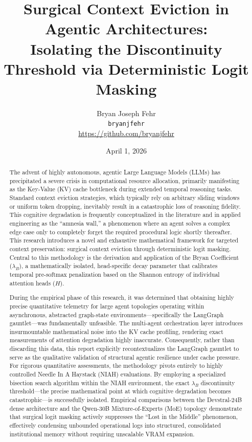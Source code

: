 \documentclass[11pt,a4paper]{article}
\title{Surgical Context Eviction in Agentic Architectures: \\ Isolating the Discontinuity Threshold via Deterministic Logit Masking}
\author{%
  Bryan Joseph Fehr \\
  \texttt{bryanjfehr} \\
  \href{https://github.com/bryanjfehr}{https://github.com/bryanjfehr}
}
\date{April 1, 2026}
\newcommand{\bryanCoeff}{\lambda_B}
\newcommand{\entropy}{H}
\begin{document}
\maketitle

\begin{abstract}
The advent of highly autonomous, agentic Large Language Models (LLMs) has precipitated a severe crisis in computational resource allocation, primarily manifesting as the Key-Value (KV) cache bottleneck during extended temporal reasoning tasks. Standard context eviction strategies, which typically rely on arbitrary sliding windows or uniform token dropping, inevitably result in a catastrophic loss of reasoning fidelity. This cognitive degradation is frequently conceptualized in the literature and in applied engineering as the ``amnesia wall,'' a phenomenon where an agent solves a complex edge case only to completely forget the required procedural logic shortly thereafter. This research introduces a novel and exhaustive mathematical framework for targeted context preservation: surgical context eviction through deterministic logit masking. Central to this methodology is the derivation and application of the Bryan Coefficient (\(\bryanCoeff\)), a mathematically isolated, head-specific decay parameter that calibrates temporal pre-softmax penalization based on the Shannon entropy of individual attention heads (\(\entropy\)).

During the empirical phase of this research, it was determined that obtaining highly precise quantitative telemetry for large agent topologies operating within asynchronous, abstracted graph-state environments---specifically the LangGraph gauntlet---was fundamentally unfeasible. The multi-agent orchestration layer introduces insurmountable mathematical noise into the KV cache profiling, rendering exact measurements of attention degradation highly inaccurate. Consequently, rather than discarding this data, this report explicitly recontextualizes the LangGraph gauntlet to serve as the qualitative validation of structural agentic resilience under cache pressure. For rigorous quantitative assessments, the methodology pivots entirely to highly controlled Needle In A Haystack (NIAH) evaluations. By employing a specialized bisection search algorithm within the NIAH environment, the exact \(\bryanCoeff\) discontinuity threshold---the precise mathematical point at which cognitive degradation becomes catastrophic---is successfully isolated. Empirical comparisons between the Devstral-24B dense architecture and the Qwen-30B Mixture-of-Experts (MoE) topology demonstrate that surgical logit masking actively suppresses the ``Lost in the Middle'' phenomenon, effectively condensing unbounded operational logs into structured, consolidated institutional memory without requiring unscalable VRAM expansion.
\end{abstract}
\end{document}
